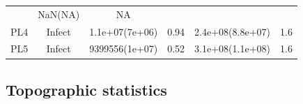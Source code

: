 \documentclass[]{article}
\begin{document}
\begin{longtable}[]{@{}cccccc@{}}
\begin{minipage}[t]{0.16\columnwidth}
\end{minipage} & \begin{minipage}[t]{0.17\columnwidth}\centering\strut
NaN(NA)\strut
\end{minipage} & \begin{minipage}[t]{0.12\columnwidth}\centering\strut
NA\strut
\end{minipage}\tabularnewline
\begin{minipage}[t]{0.12\columnwidth}\centering\strut
PL4\strut
\end{minipage} & \begin{minipage}[t]{0.12\columnwidth}\centering\strut
Infect\strut
\end{minipage} & \begin{minipage}[t]{0.16\columnwidth}\centering\strut
1.1e+07(7e+06)\strut
\end{minipage} & \begin{minipage}[t]{0.16\columnwidth}\centering\strut
0.94\strut
\end{minipage} & \begin{minipage}[t]{0.17\columnwidth}\centering\strut
2.4e+08(8.8e+07)\strut
\end{minipage} & \begin{minipage}[t]{0.12\columnwidth}\centering\strut
1.6\strut
\end{minipage}\tabularnewline
\begin{minipage}[t]{0.12\columnwidth}\centering\strut
PL5\strut
\end{minipage} & \begin{minipage}[t]{0.12\columnwidth}\centering\strut
Infect\strut
\end{minipage} & \begin{minipage}[t]{0.16\columnwidth}\centering\strut
9399556(1e+07)\strut
\end{minipage} & \begin{minipage}[t]{0.16\columnwidth}\centering\strut
0.52\strut
\end{minipage} & \begin{minipage}[t]{0.17\columnwidth}\centering\strut
3.1e+08(1.1e+08)\strut
\end{minipage} & \begin{minipage}[t]{0.12\columnwidth}\centering\strut
1.6\strut
\end{minipage}\tabularnewline
\bottomrule
\end{longtable}

\newpage

\subsection{Topographic statistics}\label{topographic-statistics}
\end{document}
